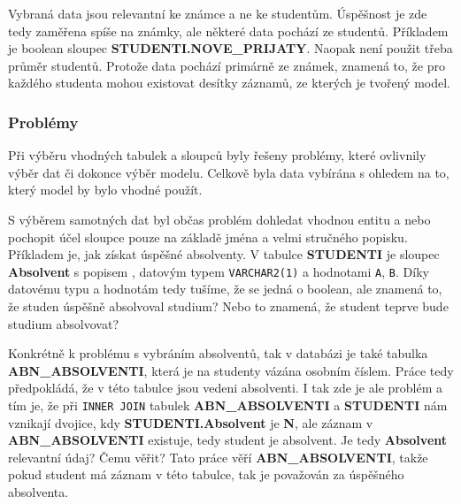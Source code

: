 \documentclass[12pt, letterpaper]{article}
\begin{document}
Vybraná data jsou relevantní ke známce a ne ke studentům. Úspěšnost je zde tedy zaměřena spíše na známky, ale některé 
data pochází ze studentů. Příkladem je boolean sloupec \textbf{STUDENTI.NOVE\_PRIJATY}. Naopak není použit třeba 
průměr studentů. Protože data pochází primárně ze známek, znamená to, že pro každého studenta mohou existovat desítky
záznamů, ze kterých je tvořený model.
\subsubsection{Problémy}
Při výběru vhodných tabulek a sloupců byly řešeny problémy, které ovlivnily výběr dat či dokonce výběr modelu. Celkově
byla data vybírána s ohledem na to, který model by bylo vhodné použít.

S výběrem samotných dat byl občas problém dohledat vhodnou entitu a nebo pochopit účel sloupce pouze na základě jména
a velmi stručného popisku. Příkladem je, jak získat úspěšné absolventy. V tabulce \textbf{STUDENTI} je sloupec 
\textbf{Absolvent} s popisem , datovým typem \texttt{VARCHAR2(1)} a hodnotami \texttt{A}, 
\texttt{B}. Díky datovému typu a hodnotám tedy tušíme, že se jedná o boolean, ale znamená to, že studen úspěšně 
absolvoval studium? Nebo to znamená, že student teprve bude studium absolvovat?

Konkrétně k problému s vybráním absolventů, tak v databázi je také tabulka \textbf{ABN\_ABSOLVENTI}, která je na 
studenty vázána osobním číslem. Práce tedy předpokládá, že v této tabulce jsou vedeni absolventi. I tak zde je ale 
problém a tím je, že při \texttt{INNER JOIN} tabulek \textbf{ABN\_ABSOLVENTI} a \textbf{STUDENTI} nám vznikají dvojice,
kdy \textbf{STUDENTI.Absolvent} je \textbf{N}, ale záznam v \textbf{ABN\_ABSOLVENTI} existuje, tedy student je 
absolvent. Je tedy \textbf{Absolvent} relevantní údaj? Čemu věřit? Tato práce věří \textbf{ABN\_ABSOLVENTI}, takže
pokud student má záznam v této tabulce, tak je považován za úspěšného absolventa.
\end{document}
